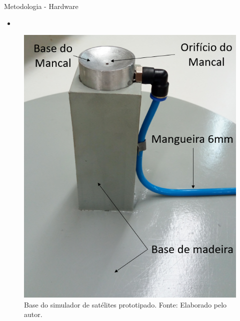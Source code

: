 \documentclass{beamer}
\begin{document}

\begin{frame}{Metodologia - Hardware}
	\begin{itemize}
		\justifying
    	\item \href{https://youtu.be/TpdmkFmt9iw}{}
    \end{itemize}
    \begin{figure}[HT]
		\begin{center}
		\captionsetup{justification=centering}
        \includegraphics[scale=.25]{../metodologia/img/base_real}
        \caption{Base do simulador de satélites prototipado. \newline
        		 Fonte: Elaborado pelo autor.}
		\label{FIG_ADAPTATIVO}
        \end{center}
	\end{figure}	

\end{frame}

\end{document}
